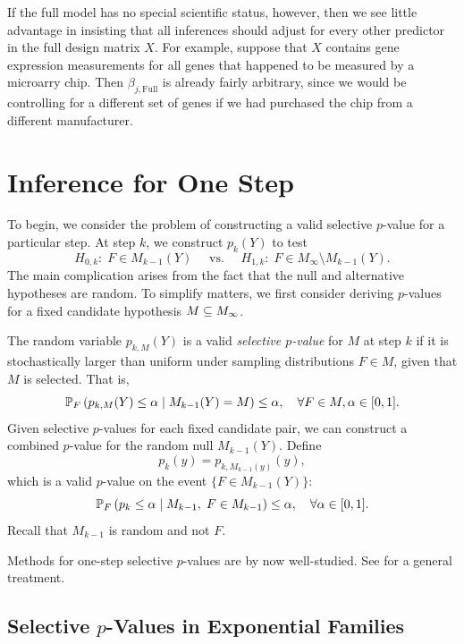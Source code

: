 \documentclass{article}
\begin{document}
If the full model has no special scientific status, however, then we see little advantage in insisting that all inferences should adjust for every other predictor in the full design matrix $X$. For example, suppose that $X$ contains gene expression measurements for all genes that happened to be measured by a microarry chip. Then $\beta_{j,\text{Full}}$ is already fairly arbitrary, since we would be controlling for a different set of genes if we had purchased the chip from a different manufacturer.



\section{Inference for One Step}

To begin, we consider the problem of constructing a valid selective $p$-value for a particular step. At step $k$, we construct $p_k(Y)$ to test
\[
  H_{0,k}:\; F \in M_{k-1}(Y)
  \quad \text{ vs. } \quad
  H_{1,k}:\; F \in M_\infty \setminus M_{k-1}(Y).
\]
The main complication arises from the fact that the null and alternative hypotheses are random. To simplify matters, we first consider deriving $p$-values for a fixed candidate hypothesis $M\sub M_{\infty}$.

The random variable  $p_{k,M}(Y)$ is a valid {\em selective $p$-value} for $M$ at step $k$ if it is stochastically larger than uniform under sampling distributions $F\in M$, given that $M$ is selected. That is,
\[
\P_F\left(p_{k,M}(Y) \leq \alpha \mid M_{k-1}(Y) = M\right) 
\leq \alpha, \quad \forall F\in M, \alpha \in [0,1].
\]
Given selective $p$-values for each fixed candidate pair, we can construct a combined $p$-value for the random null $M_{k-1}(Y)$. Define
\[
p_k(y) = p_{k, M_{k-1}(y)}(y),
\]
which is a valid $p$-value on the event $\{F \in M_{k-1}(Y)\}$:
\[
\P_F\left(p_k \leq \alpha \mid M_{k-1}, 
  \;F\in M_{k-1}\right) \leq \alpha, \quad \forall \alpha \in [0,1].
\]
Recall that $M_{k-1}$ is random and not $F$.

Methods for one-step selective $p$-values are by now well-studied.  See \citet{fithian2014optimal} for a general treatment. 


\subsection{Selective $p$-Values in Exponential Families}
\end{document}
